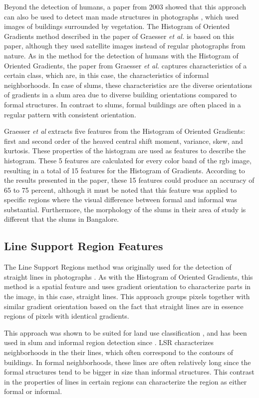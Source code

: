 Beyond the detection of humans, a paper from 2003 showed that this approach can also be used to detect man made structures in photographs \cite{kumar2003man}, which used images of buildings surrounded by vegetation. The Histogram of Oriented Gradients method described in the paper of Graesser \textit{et al.} is based on this paper, although they used satellite images instead of regular photographs from nature. As in the method for the detection of humans with the Histogram of Oriented Gradients, the paper from Graesser \textit{et al.} captures characteristics of a certain class, which are, in this case, the characteristics of informal neighborhoods. In case of slums, these characteristics are the diverse orientations of gradients in a slum area due to diverse building orientations compared to formal structures. In contrast to slums, formal buildings are often placed in a regular pattern with consistent orientation.

Graesser \textit{et al} extracts five features from the Histogram of Oriented Gradients: first and second order of the heaved central shift moment, variance, skew, and kurtosis. These properties of the histogram are used as features to describe the histogram. These 5 features are calculated for every color band of the rgb image, resulting in a total of 15 features for the Histogram of Gradients. According to the results presented in the paper, these 15 features could produce an accuracy of 65 to 75 percent, although it must be noted that this feature was applied to specific regions where the visual difference between formal and informal was substantial. Furthermore, the morphology of the slums in their area of study is different that the slums in Bangalore.


\subsection{Line Support Region Features}

The Line Support Regions method was originally used for the detection of straight lines in photographs \cite{burns1986extracting}. As with the Histogram of Oriented Gradients, this method is a spatial feature and uses gradient orientation to characterize parts in the image, in this case, straight lines. This approach groups pixels together with similar gradient orientation based on the fact that straight lines are in essence regions of pixels with identical gradients. 

This approach was shown to be suited for land use classification \cite{unsalan2004classifying} \cite{unsalan2006gradient}, and has been used in slum and informal region detection since \cite{graesser2012image} \cite{accra} \cite{colombo}. LSR characterizes neighborhoods in the their lines, which often correspond to the contours of buildings. In formal neighborhoods, these lines are often relatively long since the formal structures tend to be bigger in size than informal structures. This contrast in the properties of lines in certain regions can characterize the region as either formal or informal.

